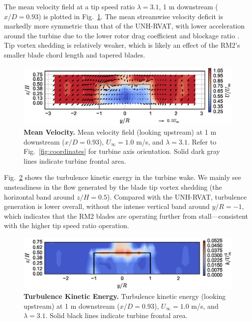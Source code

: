 \documentclass[10pt,letterpaper]{article}
\begin{document}
The mean velocity field at a tip speed ratio $\lambda=3.1$, 1 m downstream
($x/D=0.93$) is plotted in Fig.~\ref{fig:meancontquiv}. The mean streamwise
velocity deficit is markedly more symmetric than that of the UNH-RVAT, with
lower acceleration around the turbine due to the lower rotor drag coefficient
and blockage ratio \cite{Bachant2015-JoT}. Tip vortex shedding is relatively
weaker, which is likely an effect of the RM2's smaller blade chord length and
tapered blades.

\begin{figure}[h]
    \includegraphics[width=\textwidth]{figures/meancontquiv.eps}

    \caption{{\bf Mean Velocity.} Mean velocity field (looking upstream) at 1 m
    downstream ($x/D=0.93$), $U_\infty=1.0$ m/s, and $\lambda=3.1$. Refer to
    Fig.~\ref{fig:coordinates} for turbine axis orientation. Solid dark gray
    lines indicate turbine frontal area.}

    \label{fig:meancontquiv}
\end{figure}

Fig.~\ref{fig:kcont} shows the turbulence kinetic energy in the turbine wake. We
mainly see unsteadiness in the flow generated by the blade tip vortex shedding
(the horizontal band around $z/H=0.5$). Compared with the UNH-RVAT, turbulence
generation is lower overall, without the intense vertical band around $y/R=-1$,
which indicates that the RM2 blades are operating further from
stall---consistent with the higher tip speed ratio operation.

\begin{figure}[h]
    \includegraphics[width=\textwidth]{figures/k_contours.eps}

    \caption{{\bf Turbulence Kinetic Energy.} Turbulence kinetic energy (looking
    upstream) at 1 m downstream ($x/D=0.93$), $U_\infty=1.0$ m/s, and
    $\lambda=3.1$. Solid black lines indicate turbine frontal area.}

    \label{fig:kcont}
\end{figure}
\end{document}
